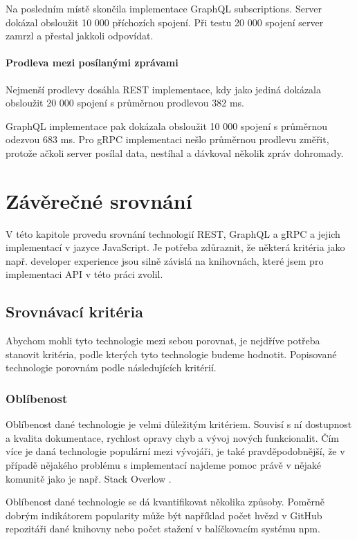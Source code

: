 \documentclass[thesis=M,czech]{FITthesis}[2019/12/23]
\begin{document}
Na posledním místě skončila implementace GraphQL subscriptions. Server dokázal obsloužit 10 000 příchozích spojení. Při testu 20 000 spojení server zamrzl a přestal jakkoli odpovídat.

\subsubsection*{Prodleva mezi posílanými zprávami}
Nejmenší prodlevy dosáhla REST implementace, kdy jako jediná dokázala obsloužit 20 000 spojení s průměrnou prodlevou 382 ms.

GraphQL implementace pak dokázala obsloužit 10 000 spojení s průměrnou odezvou 683 ms. Pro gRPC implementaci nešlo průměrnou prodlevu změřit, protože ačkoli server posílal data, nestíhal a dávkoval několik zpráv dohromady.

\chapter{Závěrečné srovnání}
V této kapitole provedu srovnání technologií REST, GraphQL a gRPC a jejich implementací v jazyce JavaScript. Je potřeba zdůraznit, že některá kritéria jako např. developer experience jsou silně závislá na knihovnách, které jsem pro implementaci API v této práci zvolil.

\section{Srovnávací kritéria}
Abychom mohli tyto technologie mezi sebou porovnat, je nejdříve potřeba stanovit kritéria, podle kterých tyto technologie budeme hodnotit. Popisované technologie porovnám podle následujících kritérií.


\subsection{Oblíbenost}
Oblíbenost dané technologie je velmi důležitým kritériem. Souvisí s ní dostupnost a kvalita dokumentace, rychlost opravy chyb a vývoj nových funkcionalit. Čím více je daná technologie populární mezi vývojáři, je také pravděpodobnější, že v případě nějakého problému s implementací najdeme pomoc právě v nějaké komunitě jako je např. Stack Overlow \cite{stack_overflow}.

Oblíbenost dané technologie se dá kvantifikovat několika způsoby. Poměrně dobrým indikátorem popularity může být například počet hvězd v GitHub repozitáři dané knihovny nebo počet stažení v balíčkovacím systému npm.
\end{document}
